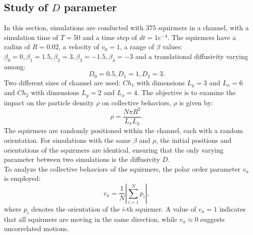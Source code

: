 \documentclass{article}
\begin{document}
\subsection{Study of $D$ parameter}
In this section, simulations are conducted with $375$ squirmers in a channel, with a simulation time of $T=50$ and a time step of $dt=1e^{-4}$. 
The squirmers have 
a radius of $R = 0.02$, a velocity of $v_0 = 1$, a range of $\beta$ values:
$\beta_0 = 0, \beta_1 = 1.5, \beta_2 = 3, \beta_3 = -1.5, \beta_4 = -3$
 and a translational diffusivity varying among:
$$D_0 = 0.5, D_1 = 1, D_2 = 3.$$
Two different sizes of channel are used: $Ch_1$ with dimensions $L_y = 3$ and $L_x = 6$ and $Ch_2$ with dimensions $L_y=2$ and $L_x=4$. 
The objective is to examine 
the impact on the particle density $\rho$ on collective behaviors, $\rho$ is given by:
$$\rho = \frac{N\pi R^2}{L_xL_y}.$$
The squirmers are randomly positioned within the channel, each with a random orientation.
For simulations with the same $\beta$ and $\rho$, the initial positions and orientations of the squirmers are identical,
ensuring that the only varying parameter between two simulations is the diffusivity $D$.\\
To analyze the collective behaviors of the squirmers, the polar order parameter $v_a$ is employed:
$$v_a = \frac{1}{N}\left|\sum^{N}_{i=1}p_i\right|,$$
where $p_i$ denotes the orientation of the $i$-th squirmer.
A value of $v_a = 1$ indicates that all squirmers are moving in the same direction, while $v_a\approx 0$ suggests uncorrelated motions.
\end{document}

